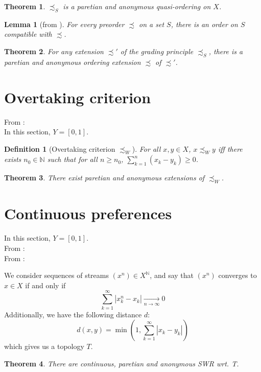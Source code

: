 \documentclass{article}
\newtheorem{definition}{Definition}
\newtheorem{theorem}{Theorem}
\newtheorem{lemma}{Lemma}
\begin{document}
\begin{theorem}
    $\precsim_S$ is a paretian and anonymous quasi-ordering on $X$.
\end{theorem}

\begin{lemma}[from \cite{szpilrajn30}]
    For every preorder $\precsim$ on a set $S$, there is an order on
    $S$ compatible with $\precsim$.
\end{lemma}

\begin{theorem}
    For any extension $\precsim'$ of the grading principle 
    $\precsim_S$, there is a paretian
    and anonymous ordering extension $\precsim$ of $\precsim'$.
\end{theorem}


\section{Overtaking criterion}

From \cite{svensson80}:\bigskip\\
In this section, $Y=[0,1]$.

\begin{definition}[Overtaking criterion $\precsim_W$]
    For all $x,y\in X$, $x \precsim_W y$ iff there exists
    $n_0\in\mathbb{N}$ such that for all $n\geq n_0$,
    $\sum_{k=1}^n (x_k - y_k)\geq 0$.
\end{definition}

\begin{theorem}
    There exist paretian and anonymous extensions of $\precsim_W$.
\end{theorem}


\section{Continuous preferences}
In this section, $Y=[0,1]$.
\smallskip\\
From \cite{diamond65}:
\bigskip\\
From \cite{svensson80}:\smallskip\par
We consider sequences of streams $(x^n)\in X^\mathbb{N}$, and say that
$(x^n)$ converges to $x\in X$ if and only if
\[\sum_{k=1}^\infty |x^n_k - x_k| \underset{n\rightarrow\infty}{\rightarrow}0\]
Additionally, we have the following distance $d$:
\[d(x,y)=\min\left(1,\sum_{k=1}^\infty |x_k - y_k|\right)\]
which gives us a topology $T$.

\begin{theorem}
    There are continuous, paretian and anonymous SWR wrt. T.
\end{theorem}
\end{document}
